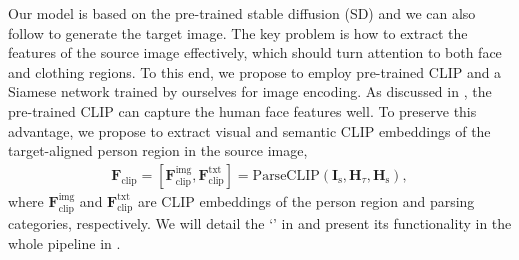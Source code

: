 Our model is based on the pre-trained stable diffusion (SD) and we can also follow  to generate the target image.
%
The key problem is how to extract the features of the source image effectively, which should turn attention to both face and clothing regions.
%
To this end, we propose to employ pre-trained CLIP and a Siamese network trained by ourselves for image encoding. As discussed in , the pre-trained CLIP can capture the human face features well. To preserve this advantage, we propose to extract visual and semantic CLIP embeddings of the target-aligned person region in the source image,
%
\begin{align} \label{eq:pareclip}
    \mathbf{F}_\text{clip} = [\mathbf{F}_\text{clip}^\text{img}, \mathbf{F}_\text{clip}^\text{txt}] =  \text{ParseCLIP}(\mathbf{I}_\text{s},\mathbf{H}_\tau,\mathbf{H}_\text{s}),
\end{align}
%
where $\mathbf{F}_\text{clip}^\text{img}$ and $\mathbf{F}_\text{clip}^\text{txt}$ are CLIP embeddings of the person region and parsing categories, respectively. 
%
We will detail the `' in  and present its functionality in the whole pipeline in
.

